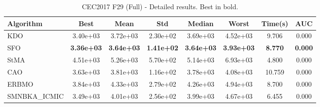 \begin{table}[H]
\centering\small
\caption{CEC2017 F29 (Full) - Detailed results. Best in bold.}
\label{tab:cec2017_F29}
\begin{tabular}{lccccccc}
\toprule
\textbf{Algorithm} & \textbf{Best} & \textbf{Mean} & \textbf{Std} & \textbf{Median} & \textbf{Worst} & \textbf{Time(s)} & \textbf{AUC} \\
\midrule
KDO & 3.40e+03 & 3.72e+03 & 2.30e+02 & 3.69e+03 & 4.52e+03 & 9.706 & 0.000 \\
SFO & \textbf{3.36e+03} & \textbf{3.64e+03} & \textbf{1.41e+02} & \textbf{3.64e+03} & \textbf{3.93e+03} & \textbf{8.770} & \textbf{0.000} \\
StMA & 4.51e+03 & 5.26e+03 & 5.70e+02 & 5.14e+03 & 6.93e+03 & 4.800 & 0.000 \\
CAO & 3.63e+03 & 3.81e+03 & 1.16e+02 & 3.78e+03 & 4.08e+03 & 10.759 & 0.000 \\
ERBMO & 3.84e+03 & 4.33e+03 & 2.79e+02 & 4.26e+03 & 4.94e+03 & 8.700 & 0.000 \\
SMNBKA_ICMIC & 3.49e+03 & 4.01e+03 & 2.56e+02 & 3.99e+03 & 4.67e+03 & 6.455 & 0.000 \\
\bottomrule
\end{tabular}
\end{table}
